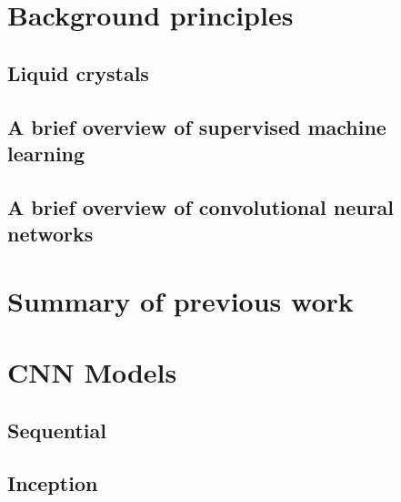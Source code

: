 \documentclass[12pt]{article}
\begin{document}





\section{Background principles}

\subsection{Liquid crystals}

\subsection{A brief overview of supervised machine learning}

\subsection{A brief overview of convolutional neural networks}

\section{Summary of previous work}

\section{CNN Models}

\subsection{Sequential}

\subsection{Inception}
\end{document}
